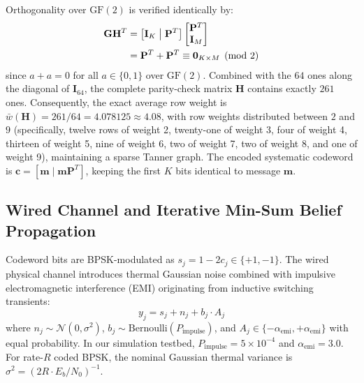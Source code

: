 \documentclass[conference]{IEEEtran}
\begin{document}
Orthogonality over $\text{GF}(2)$ is verified identically by:
\begin{align}
    \mathbf{G} \mathbf{H}^T &= \left[ \mathbf{I}_K \;\middle|\; \mathbf{P}^T \right] \begin{bmatrix} \mathbf{P}^T \\ \mathbf{I}_M \end{bmatrix} \notag \\
    &= \mathbf{P}^T + \mathbf{P}^T \equiv \mathbf{0}_{K \times M} \pmod 2
\end{align}
since $a + a = 0$ for all $a \in \{0, 1\}$ over $\text{GF}(2)$. Combined with the $64$ ones along the diagonal of $\mathbf{I}_{64}$, the complete parity-check matrix $\mathbf{H}$ contains exactly $261$ ones. Consequently, the exact average row weight is $\bar{w}(\mathbf{H}) = 261/64 = 4.078125 \approx \mathbf{4.08}$, with row weights distributed between $2$ and $9$ (specifically, twelve rows of weight 2, twenty-one of weight 3, four of weight 4, thirteen of weight 5, nine of weight 6, two of weight 7, two of weight 8, and one of weight 9), maintaining a sparse Tanner graph. The encoded systematic codeword is $\mathbf{c} = [\mathbf{m} \mid \mathbf{m}\mathbf{P}^T]$, keeping the first $K$ bits identical to message $\mathbf{m}$.

\subsection{Wired Channel and Iterative Min-Sum Belief Propagation}
\label{subsec:channel_bp}
Codeword bits are BPSK-modulated as $s_j = 1 - 2c_j \in \{+1, -1\}$. The wired physical channel introduces thermal Gaussian noise combined with impulsive electromagnetic interference (EMI) originating from inductive switching transients:
\begin{equation}
    y_j = s_j + n_j + b_j \cdot A_j
    \label{eq:channel_model}
\end{equation}
where $n_j \sim \mathcal{N}(0, \sigma^2)$, $b_j \sim \text{Bernoulli}(P_{\text{impulse}})$, and $A_j \in \{-\alpha_{\text{emi}}, +\alpha_{\text{emi}}\}$ with equal probability. In our simulation testbed, $P_{\text{impulse}} = 5 \times 10^{-4}$ and $\alpha_{\text{emi}} = 3.0$. For rate-$R$ coded BPSK, the nominal Gaussian thermal variance is $\sigma^2 = (2R \cdot E_b/N_0)^{-1}$.
\end{document}
